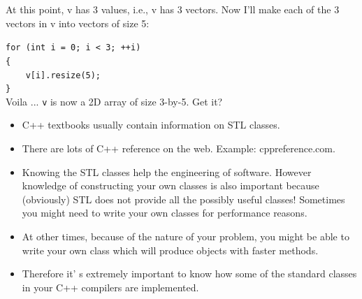 At this point, v has 3 values, i.e., v has 3 vectors. Now I'll make each
of the 3 vectors in v into vectors of size 5:

\verb!for (int i = 0; i < 3; ++i)!\\
\verb!{!\\            
\verb!    v[i].resize(5);!\\
\verb!}!\\

Voila ... \verb!v! is now a 2D array of size 3-by-5. Get it?

\newpage{}

\begin{itemize}
\item
  C++ textbooks usually contain information on STL classes.
\item
  There are lots of C++ reference on the web. Example: cppreference.com.
\item
  Knowing the STL classes help the engineering of software.
  However knowledge of constructing your own classes is also important because (obviously) STL does not provide all the possibly useful classes! Sometimes you might need to write your own classes for performance reasons.
\item
  At other times, because of the nature of your problem, you might be
  able to write your own class which will produce objects with faster
  methods.
\item
  Therefore it' s extremely important to know how some of
  the standard classes in your C++ compilers are implemented.
\end{itemize}


